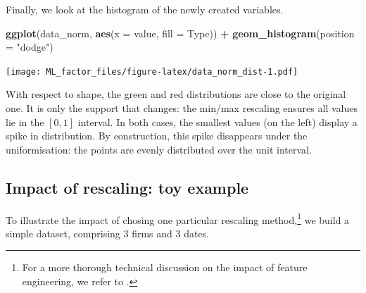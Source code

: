 \documentclass[]{krantz}
\makeatletter
\newenvironment{Shaded}{\begin{snugshade}}{\end{snugshade}}
\newcommand{\DataTypeTok}[1]{\textcolor[rgb]{0.27,0.27,0.27}{#1}}
\newcommand{\KeywordTok}[1]{\textcolor[rgb]{0.27,0.27,0.27}{\textbf{#1}}}
\newcommand{\NormalTok}[1]{#1}
\newcommand{\OperatorTok}[1]{\textcolor[rgb]{0.43,0.43,0.43}{\textbf{#1}}}
\newcommand{\StringTok}[1]{\textcolor[rgb]{0.5,0.5,0.5}{#1}}
\newenvironment{kframe}{%
\medskip{}
\setlength{\fboxsep}{.8em}
 \def\at@end@of@kframe{}%
 \ifinner\ifhmode%
  \def\at@end@of@kframe{\end{minipage}}%
  \begin{minipage}{\columnwidth}%
 \fi\fi%
 \def\FrameCommand##1{\hskip\@totalleftmargin \hskip-\fboxsep
 \colorbox{shadecolor}{##1}\hskip-\fboxsep
     \hskip-\linewidth \hskip-\@totalleftmargin \hskip\columnwidth}%
 \MakeFramed {\advance\hsize-\width
   \@totalleftmargin\z@ \linewidth\hsize
   \@setminipage}}%
 {\par\unskip\endMakeFramed%
 \at@end@of@kframe}
\renewenvironment{Shaded}{\begin{kframe}}{\end{kframe}}
\let\rmarkdownfootnote\footnote%
\def\footnote{\protect\rmarkdownfootnote}
\theoremstyle{definition}
\theoremstyle{definition}
\theoremstyle{definition}
\theoremstyle{remark}
\makeatother
\begin{document}
\normalsize

Finally, we look at the histogram of the newly created variables.

\footnotesize

\begin{Shaded}
\begin{Highlighting}[]
\KeywordTok{ggplot}\NormalTok{(data_norm, }\KeywordTok{aes}\NormalTok{(}\DataTypeTok{x =}\NormalTok{ value, }\DataTypeTok{fill =}\NormalTok{ Type)) }\OperatorTok{+}\StringTok{ }\KeywordTok{geom_histogram}\NormalTok{(}\DataTypeTok{position =} \StringTok{"dodge"}\NormalTok{)}
\end{Highlighting}
\end{Shaded}

\texttt{[image: ML\_factor\_files/figure-latex/data\_norm\_dist-1.pdf]}

\normalsize

With respect to shape, the green and red distributions are close to the
original one. It is only the support that changes: the min/max rescaling
ensures all values lie in the \([0,1]\) interval. In both cases, the
smallest values (on the left) display a spike in distribution. By
construction, this spike disappears under the uniformisation: the points
are evenly distributed over the unit interval.

\hypertarget{impact-of-rescaling-toy-example}{%
\subsection{Impact of rescaling: toy
example}\label{impact-of-rescaling-toy-example}}

To illustrate the impact of chosing one particular rescaling
method,\footnote{For a more thorough technical discussion on the impact
  of feature engineering, we refer to \citet{galili2016splitting}.} we
build a simple dataset, comprising 3 firms and 3 dates.

\footnotesize
\end{document}
